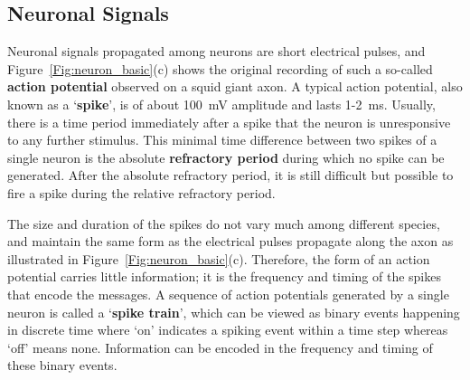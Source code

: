 %


\subsection{Neuronal Signals}
Neuronal signals propagated among neurons are short electrical pulses, and Figure~\ref{Fig:neuron_basic}(c) shows the original recording of such a so-called \textbf{action potential} observed on a squid giant axon.
A typical action potential, also known as a `\textbf{spike}', is of about 100~mV amplitude and lasts 1-2~ms.
Usually, there is a time period immediately after a spike that the neuron is unresponsive to any further stimulus.
This minimal time difference between two spikes of a single neuron is the absolute \textbf{refractory period} during which no spike can be generated.
After the absolute refractory period, it is still difficult but possible to 
fire a spike during the relative refractory period.

The size and duration of the spikes do not vary much among different species, and maintain the same form as the electrical pulses propagate along the axon as illustrated in Figure~\ref{Fig:neuron_basic}(c).
Therefore, the form of an action potential carries little information;
it is the frequency and timing of the spikes that encode the messages.
A sequence of action potentials generated by a single neuron is called a `\textbf{spike train}', which can be viewed as binary events happening in discrete time where `on' indicates a spiking event within a time step whereas `off' means none.
Information can be encoded in the frequency and timing of these binary events.



